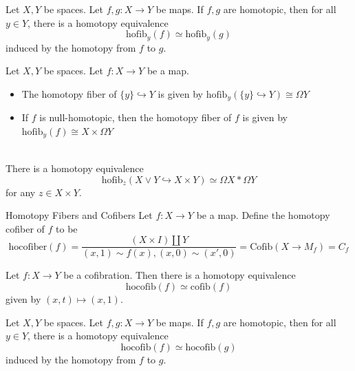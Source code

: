 \documentclass[a4paper]{article}
\begin{document}
\begin{prp}{}{} Let $X,Y$ be spaces. Let $f,g:X\to Y$ be maps. If $f,g$ are homotopic, then for all $y\in Y$, there is a homotopy equivalence $$\text{hofib}_y(f)\simeq\text{hofib}_y(g)$$ induced by the homotopy from $f$ to $g$. 
\end{prp}

\begin{eg}{}{} Let $X,Y$ be spaces. Let $f:X\to Y$ be a map. 
\begin{itemize}
\item The homotopy fiber of $\{y\}\hookrightarrow Y$ is given by $\text{hofib}_y(\{y\}\hookrightarrow Y)\cong\Omega Y$
\item If $f$ is null-homotopic, then the homotopy fiber of $f$ is given by $\text{hofib}_y(f)\cong X\times\Omega Y$
\end{itemize}
\end{eg}

\begin{eg}{}{}\\
There is a homotopy equivalence $$\text{hofib}_z(X\vee Y\hookrightarrow X\times Y)\simeq\Omega X\ast\Omega Y$$ for any $z\in X\times Y$. 
\end{eg}

\begin{defn}{Homotopy Fibers and Cofibers}{} Let $f:X\to Y$ be a map. Define the homotopy cofiber of $f$ to be $$\text{hocofiber}(f)=\frac{(X\times I)\amalg Y}{(x,1)\sim f(x),(x,0)\sim(x',0)}=\text{Cofib}(X\to M_f)=C_f$$
\end{defn}

\begin{prp}{}{} Let $f:X\to Y$ be a cofibration. Then there is a homotopy equivalence $$\text{hocofib}(f)\simeq\text{cofib}(f)$$ given by $(x,t)\mapsto(x,1)$. 
\end{prp}

\begin{prp}{}{} Let $X,Y$ be spaces. Let $f,g:X\to Y$ be maps. If $f,g$ are homotopic, then for all $y\in Y$, there is a homotopy equivalence $$\text{hocofib}(f)\simeq\text{hocofib}(g)$$ induced by the homotopy from $f$ to $g$. 
\end{prp}
\end{document}
